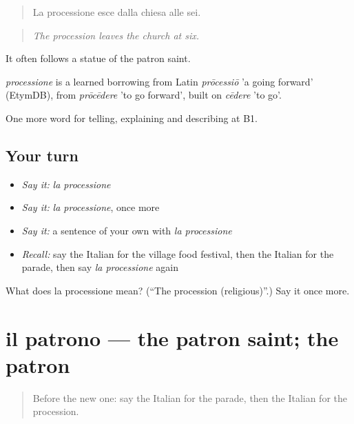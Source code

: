 \begin{quote}
La processione esce dalla chiesa alle sei.
\end{quote}

\begin{quote}
\emph{The procession leaves the church at six.}
\end{quote}

It often follows a statue of the patron saint.

\begin{cousinweb}
\emph{processione} is a learned borrowing from Latin \emph{prōcessiō} 'a going forward' (EtymDB), from \emph{prōcēdere} 'to go forward', built on \emph{cēdere} 'to go'.
\end{cousinweb}

\begin{grammarlens}[title={What you've built}]
One more word for telling, explaining and describing at B1.
\end{grammarlens}

\subsection*{Your turn}
\begin{itemize}
\raggedright
  \item \emph{Say it:} \emph{la processione}
  \item \emph{Say it:} \emph{la processione}, once more
  \item \emph{Say it:} a sentence of your own with \emph{la processione}
  \item \emph{Recall:} say the Italian for the village food festival, then the Italian for the parade, then say \emph{la processione} again
\end{itemize}

\begin{tcolorbox}[breakable,colback=teal!4,colframe=teal!35!black,title={Before you move on}]
What does la processione mean? (\textquotedblleft{}The procession (religious)\textquotedblright{}.) Say it once more.
\end{tcolorbox}
\section[il patrono]{il patrono — the patron saint; the patron}

\label{lesson:IT-C450-patrono}



\begin{quote}
Before the new one: say the Italian for the parade, then the Italian for the procession.
\end{quote}

